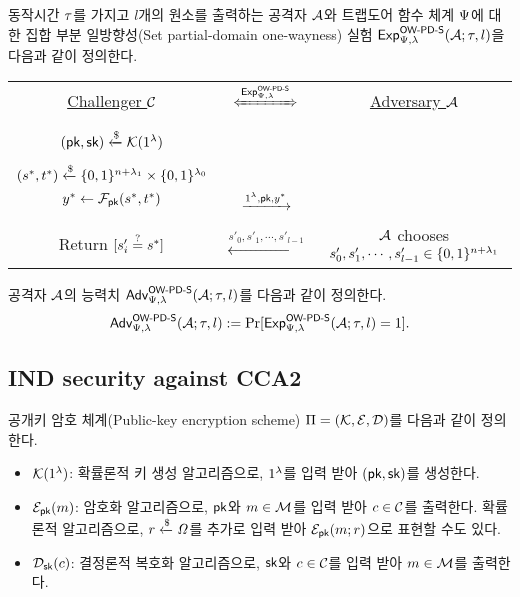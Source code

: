 \documentclass{article}
\theoremstyle{definition}
\begin{document}
동작시간 $\rt$를 가지고 $l$개의 원소를 출력하는 공격자 $\adv$와 트랩도어 함수
체계 $\tdsch$에 대한 집합 부분 일방향성(Set partial-domain one-wayness) 실험
$\Exp^{\owpds}_{\tdsch, \sp}(\adv; \rt, l)$을 다음과 같이 정의한다.
\begin{tcolorbox}[colback=white]
	\centering
	\begin{tabularx}{\linewidth}{CcC}
		\underline{Challenger $\ch$} & $\xLeftrightarrow{\Exp^{\owpds}_{\tdsch, \sp}}$ & \underline{Adversary $\adv$} \\
		\\
		$(\pk, \sk) \rgets \genkey(1^{\sp})$ & & \\
		\\
		$(s^*, t^*) \rgets \set{0, 1}^{\mlen + \sp_1} \times \set{0, 1}^{\sp_0}$ \\ $y^* \gets \td_{\pk}(s^*, t^*)$ & $\xrightarrow{1^{\sp}, \pk, y^*}$ & \\
		\\
		Return $[s'_i \same s^*]$ & $\xleftarrow{s'_0, s'_1, \cdots, s'_{l-1}}$ & $\adv$ chooses $s'_0, s'_1, \cdots, s'_{l-1} \in \set{0, 1}^{\mlen + \sp_1}$ \\
  \end{tabularx}
\end{tcolorbox}

공격자 $\adv$의 능력치 $\Adv^{\owpds}_{\tdsch, \sp}(\adv; \rt, l)$를 다음과 같이 정의한다.
$$
	\Adv^{\owpds}_{\tdsch, \sp}(\adv; \rt, l) := \Pr[\Exp^{\owpds}_{\tdsch, \sp}(\adv; \rt, l) = 1].
$$

\subsection{IND security against CCA2}

공개키 암호
체계(Public-key encryption scheme) $\sch = (\genkey, \enc, \dec)$를 다음과 같이
정의한다.
\begin{itemize}
	\item $\genkey(1^{\sp})$: 확률론적 키 생성 알고리즘으로, $1^{\sp}$를 입력
	받아 $(\pk, \sk)$를 생성한다.
	\item $\enc_{\pk}(\msg)$: 암호화 알고리즘으로, $\pk$와 $\msg \in
	\msgspace$를 입력 받아 $\ct \in \ctspace$를 출력한다. 확률론적 알고리즘으로,
	$\coin \rgets \coinspace$를 추가로 입력 받아 $\enc_{\pk}(\msg; \coin)$으로
	표현할 수도 있다.
	\item $\dec_{\sk}(\ct)$: 결정론적 복호화 알고리즘으로, $\sk$와 $\ct \in
	\ctspace$를 입력 받아 $\msg \in \msgspace$를 출력한다.
\end{itemize}
\end{document}
